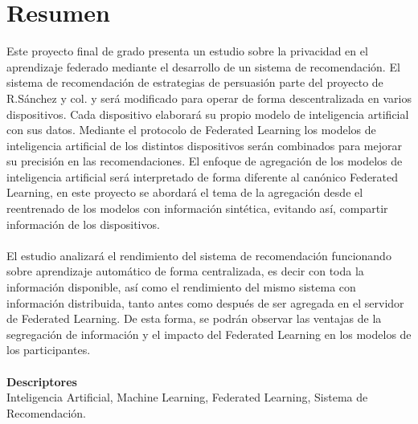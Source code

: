 \chapter*{Resumen}

\thispagestyle{fancy}

Este proyecto final de grado presenta un estudio sobre la privacidad en el aprendizaje federado mediante el desarrollo de un sistema de recomendación. El sistema de recomendación de estrategias de persuasión parte del proyecto de R.Sánchez y col.\autocite{sanchez-corcueraPersuasionbasedRecommenderSystem2020} y será modificado para operar de forma descentralizada en varios dispositivos. Cada dispositivo elaborará su propio modelo de inteligencia artificial con sus datos. Mediante el protocolo de Federated Learning los modelos de inteligencia artificial de los distintos dispositivos serán combinados para mejorar su precisión en las recomendaciones. El enfoque de agregación de los modelos de inteligencia artificial será interpretado de forma diferente al canónico Federated Learning, en este proyecto se abordará el tema de la agregación desde el reentrenado de los modelos con información sintética, evitando así, compartir información de los dispositivos.
\\\\
El estudio analizará el rendimiento del sistema de recomendación funcionando sobre aprendizaje automático de forma centralizada, es decir con toda la información disponible, así como el rendimiento del mismo sistema con información distribuida, tanto antes como después de ser agregada en el servidor de Federated Learning. De esta forma, se podrán observar las ventajas de la segregación de información y el impacto del Federated Learning en los modelos de los participantes.
\\\\
\textbf{Descriptores}\\
Inteligencia Artificial, Machine Learning, Federated Learning, Sistema de Recomendación.
